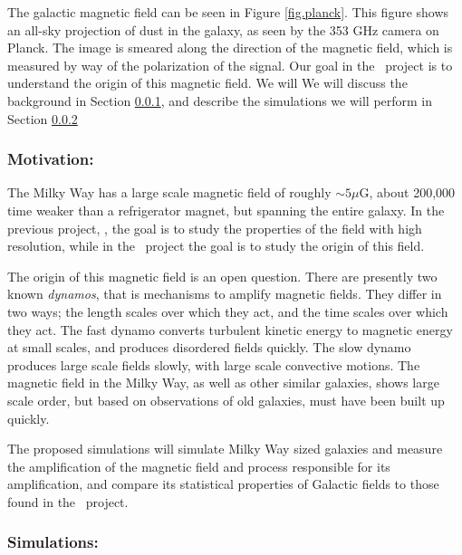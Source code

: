 The galactic magnetic field can be seen in Figure \ref{fig.planck}.  This figure
shows an all-sky projection of dust in the galaxy, as seen by the 353 GHz camera
on Planck.  The image is smeared along the direction of
the magnetic field, which is measured by way of the polarization of the signal.  Our goal in the \nameGalaxies\ project is to understand the
origin of this magnetic field.   We will We will discuss the background in Section
\ref{subsec.galaxies_motivate}, and describe the simulations we will perform in
Section \ref{subsec.galaxies_sims}

\subsubsection{Motivation: \nameGalaxies}
\label{subsec.galaxies_motivate}

The Milky Way has a large scale magnetic
field of roughly $\sim 5 \mu$G, about 200,000 time weaker than a refrigerator
magnet, but spanning the entire galaxy.   In the previous project, \nameCMB, the
goal is to study the properties of the field with high resolution, while in
the \nameGalaxies\ project the goal is to study the origin of this field.

The origin of this magnetic field is an open question.  There are presently two
known \emph{dynamos}, that is mechanisms to amplify magnetic fields. They differ in
two ways; the length scales over which they act, and the time scales over which
they act.  The fast
dynamo converts turbulent kinetic energy to magnetic energy at small scales, and
produces disordered fields quickly.  The slow dynamo produces large scale fields
slowly, with large scale convective motions. The magnetic field in the Milky Way, as well as other similar galaxies,
shows large scale order, but based on observations of old galaxies, must have been
built up quickly. 

The proposed simulations will simulate Milky Way sized galaxies and measure the
amplification of the magnetic field and process responsible for its amplification, and compare its
statistical properties of Galactic fields to those found in the \nameCMB\
project.

\subsubsection{Simulations: \nameGalaxies}
\label{subsec.galaxies_sims}

